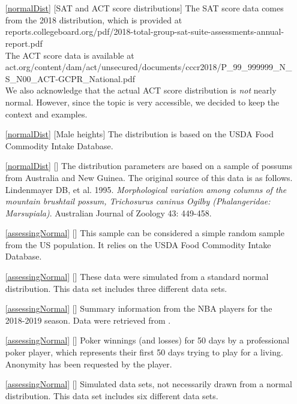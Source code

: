 \section{}
\label{ch_distributions_data}

\begin{itemize}
\item[\ref{normalDist}]
    [SAT and ACT score distributions]
    The SAT score data comes from the 2018 distribution,
    which is provided at \\
    {\small
        {reports.collegeboard.org/pdf/2018-total-group-sat-suite-assessments-annual-report.pdf}} \\
    The ACT score data is available at \\
    {\footnotesize
        {act.org/content/dam/act/unsecured/documents/cccr2018/P\_99\_999999\_N\_S\_N00\_ACT-GCPR\_National.pdf}} \\
    We also acknowledge that the actual ACT score distribution
    is \emph{not} nearly normal.
    However, since the topic is very accessible,
    we decided to keep the context and examples.
\item[\ref{normalDist}]
    [Male heights]
    The distribution is based on the
    USDA Food Commodity Intake Database.
\item[\ref{normalDist}]
    [\datalink{possum}]
    The distribution parameters are based on a sample
    of possums from Australia and New Guinea.
    The original source of this data is as follows.
    Lindenmayer DB, et al. 1995.
    \emph{Morphological variation among columns of the
        mountain brushtail possum, Trichosurus caninus
        Ogilby (Phalangeridae: Marsupiala)}.
    Australian Journal of Zoology 43: 449-458.

\item[\ref{assessingNormal}]
    [\datalink{male\_heights\_fcid}]
    This sample can be considered a simple random sample
    from the US population.
    It relies on the USDA Food Commodity Intake Database.
\item[\ref{assessingNormal}]
    [\datalink{simulated\_normal}]
    These data were simulated from a standard normal distribution.
    This data set includes three different data sets.
\item[\ref{assessingNormal}]
    [\datalink{nba\_players\_19}]
    Summary information from the NBA players for the
    2018-2019 season.
    Data were retrieved from
    .
\item[\ref{assessingNormal}]
    [\datalink{poker}]
    Poker winnings (and losses) for 50 days by a professional
    poker player, which represents their first 50 days trying
    to play for a living.
    Anonymity has been requested by the player.
\item[\ref{assessingNormal}]
    [\datalink{simulated\_dist}]
    Simulated data sets,
    not necessarily drawn from a normal distribution.
    This data set includes six different data sets.


\end{itemize}
